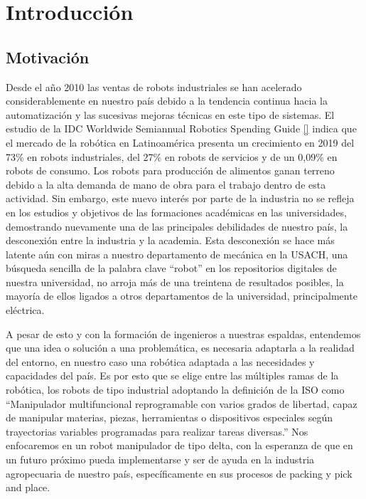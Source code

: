 \chapter{Introducción}\label{CAP1}

\section{Motivación}

Desde el año 2010 las ventas de robots industriales se han acelerado considerablemente en nuestro país debido a la tendencia continua hacia la automatización y las sucesivas mejoras técnicas en este tipo de sistemas. El estudio de la IDC Worldwide Semiannual Robotics Spending Guide \eqref{} indica que el mercado de la robótica en Latinoamérica presenta un crecimiento en 2019 del 73\% en robots industriales, del 27\% en robots de servicios y de un 0,09\% en robots de consumo. Los robots para producción de alimentos ganan terreno debido a la alta demanda de mano de obra para el trabajo dentro de esta actividad. Sin embargo, este nuevo interés por parte de la industria no se refleja en los estudios y objetivos de las formaciones académicas en las universidades, demostrando nuevamente una de las principales debilidades de nuestro país, la desconexión entre la industria y la academia. Esta desconexión se hace más latente aún con miras a nuestro departamento de mecánica en la USACH, una búsqueda sencilla de la palabra clave “robot” en los repositorios digitales de nuestra universidad, no arroja más de una treintena de resultados posibles, la mayoría de ellos ligados a otros departamentos de la universidad, principalmente eléctrica.

A pesar de esto y con la formación de ingenieros a nuestras espaldas, entendemos que una idea o solución a una problemática, es necesaria adaptarla a la realidad del entorno, en nuestro caso una robótica adaptada a las necesidades y capacidades del país. Es por esto que se elige entre las múltiples ramas de la robótica, los robots de tipo industrial adoptando la definición de la ISO como “Manipulador multifuncional reprogramable con varios grados de libertad, capaz de manipular materias, piezas, herramientas o dispositivos especiales según trayectorias variables programadas para realizar tareas diversas.” Nos enfocaremos en un robot manipulador de tipo delta, con la esperanza de que en un futuro próximo pueda implementarse y ser de ayuda en la industria agropecuaria de nuestro país, específicamente en sus procesos de packing y pick and place.

